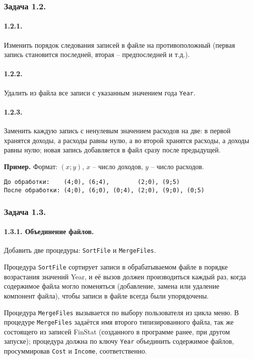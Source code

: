 \documentclass[12pt,a4paper]{report}
\begin{document}
\subsubsection{Задача 1.2.}
\paragraph{1.2.1.} Изменить порядок следования записей в файле на противоположный (первая запись становится последней, вторая -- предпоследней и т.д.).
\paragraph{1.2.2.} Удалить из файла все записи с указанным значением года \texttt{Year}.
\paragraph{1.2.3.} Заменить каждую запись с ненулевым значением расходов на две: в первой хранятся доходы, а расходы равны нулю, а во второй хранятся расходы, а доходы равны нулю; новая запись добавляется в файл сразу после предыдущей.

\textbf{Пример.} Формат: $(x;y)$, $x$ -- число доходов, $y$ -- число расходов.
\begin{verbatim}
До обработки:    (4;0), (6;4),        (2;0), (9;5)
После обработки: (4;0), (6;0), (0;4), (2;0), (9;0), (0;5)
\end{verbatim}


\subsubsection{Задача 1.3.}
\paragraph{1.3.1. Объединение файлов.} Добавить две процедуры: \texttt{SortFile} и \texttt{MergeFiles}.

Процедура \texttt{SortFile} сортирует записи в обрабатываемом файле в порядке возрастания значений Year, и её вызов должен производиться каждый раз, когда содержимое файла могло поменяться (добавление, замена или удаление компонент файла), чтобы записи в файле всегда были упорядочены.

Процедура \texttt{MergeFiles} вызывается по выбору пользователя из цикла меню. В процедуре \texttt{MergeFiles} задаётся имя второго типизированного файла, так же состоящего из записей FinStat (созданного в программе ранее, при другом запуске); процедура должна по ключу \texttt{Year} объединить содержимое файлов, просуммировав \texttt{Cost} и \texttt{Income}, соответственно.
\end{document}
